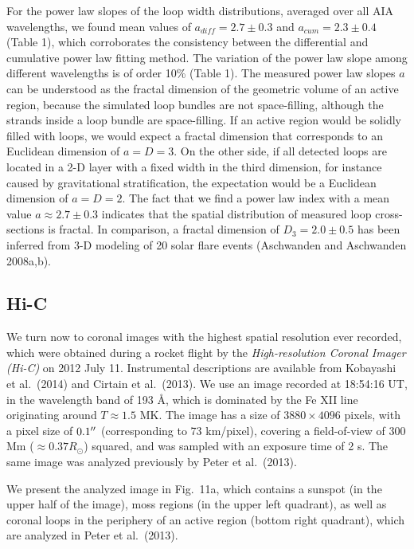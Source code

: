 \documentclass[10pt,preprint]{aastex}  %
\def\ang{\AA}
\def\arcsec{\hbox{$^{\prime\prime}$}}
\begin{document}
For the power law slopes of the loop width distributions,
averaged over all AIA wavelengths, we found 
mean values of $a_{diff}=2.7\pm0.3$ and $a_{cum}=2.3\pm0.4$ (Table 1),
which corroborates the consistency between the differential and 
cumulative power law fitting method. The variation of the power
law slope among different wavelengths is of order 10\% (Table 1).
The measured power law slopes $a$ can be understood as the
fractal dimension of the geometric volume of an active region,
because the simulated loop bundles are not space-filling,
although the strands inside a loop bundle are space-filling.
If an active region would be
solidly filled with loops, we would expect a fractal dimension
that corresponds to an Euclidean dimension of $a=D=3$.
On the other side, if all detected loops are located in a
2-D layer with a fixed width in the third dimension, for
instance caused by gravitational stratification, the expectation
would be a Euclidean dimension of $a=D=2$. The fact that we find 
a power law index with a mean value $a \approx 2.7\pm0.3$
indicates that the spatial distribution of measured loop
cross-sections is fractal. In comparison, a fractal dimension of 
$D_3=2.0\pm0.5$ has been inferred from 3-D modeling of 20 solar 
flare events (Aschwanden and Aschwanden 2008a,b).

\subsection{	Hi-C 			 		}

We turn now to coronal images with the highest spatial resolution
ever recorded, which were obtained during a rocket flight by
the {\sl High-resolution Coronal Imager (Hi-C)} on 2012 July 11.
Instrumental descriptions are available from Kobayashi et al.~(2014)
and Cirtain et al.~(2013). We use an image recorded at 18:54:16 UT, 
in the wavelength band of 193 \ang , which is dominated by the
Fe XII line originating around $T \approx 1.5$ MK. The image
has a size of $3880 \times 4096$ pixels, with a pixel size of
$0.1\arcsec$ (corresponding to 73 km/pixel), covering a
field-of-view of 300 Mm ($\approx 0.37 R_{\odot}$) squared, 
and was sampled with an exposure time of 2 s. The same image 
was analyzed previously by Peter et al.~(2013).

We present the analyzed image in Fig.~11a, which contains a
sunspot (in the upper half of the image), moss regions
(in the upper left quadrant), as well as coronal loops 
in the periphery of an active region (bottom right quadrant),
which are analyzed in Peter et al.~(2013).
\end{document}
